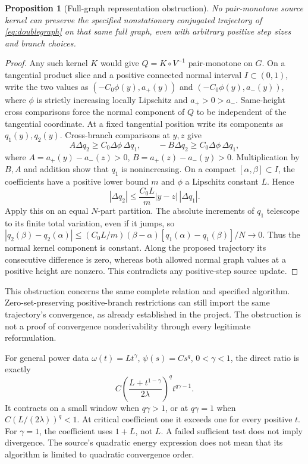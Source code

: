 \documentclass[11pt]{article}
\newtheorem{proposition}[theorem]{Proposition}
\theoremstyle{remark}
\begin{document}
\begin{proposition}[Full-graph representation obstruction]\label{prop:obstruction}
No pair-monotone source kernel can preserve the specified nonstationary
conjugated trajectory of \eqref{eq:doublegraph} on that same full graph,
even with arbitrary positive step sizes and branch choices.
\end{proposition}
\begin{proof}
Any such kernel $K$ would give $Q=K\circ V^{-1}$ pair-monotone on
$G$. On a tangential product slice and a positive connected normal
interval $I\subset(0,1)$, write the two values as
$(-C_0\phi(y),a_+(y))$ and $(-C_0\phi(y),a_-(y))$,
where $\phi$ is strictly increasing locally Lipschitz and
$a_+>0>a_-$. Same-height cross comparisons force the normal component
of $Q$ to be independent of the tangential coordinate. At a fixed
tangential position write its components as $q_1(y),q_2(y)$.
Cross-branch comparisons at $y,z$ give
\begin{equation}
 A\Delta q_2\ge C_0\Delta\phi\,\Delta q_1,\qquad
 -B\Delta q_2\ge C_0\Delta\phi\,\Delta q_1,
\end{equation}
where $A=a_+(y)-a_-(z)>0$, $B=a_+(z)-a_-(y)>0$.
Multiplication by $B,A$ and addition show that $q_1$ is nonincreasing.
On a compact $[\alpha,\beta]\subset I$, the coefficients have a
positive lower bound $m$ and $\phi$ a Lipschitz constant $L$. Hence
\begin{equation}
 |\Delta q_2|\le\frac{C_0L}{m}|y-z|\,|\Delta q_1|.
\end{equation}
Apply this on an equal $N$-part partition. The absolute increments
of $q_1$ telescope to its finite total variation, even if it jumps,
so $|q_2(\beta)-q_2(\alpha)|\le
(C_0L/m)(\beta-\alpha)[q_1(\alpha)-q_1(\beta)]/N\to0$.
Thus the normal kernel component is constant. Along the proposed
trajectory its consecutive difference is zero, whereas both allowed
normal graph values at a positive height are nonzero. This contradicts
any positive-step source update.
\end{proof}
This obstruction concerns the same complete relation and specified
algorithm. Zero-set-preserving positive-branch restrictions can still
import the same trajectory's convergence, as already established in
the project. The obstruction is not a proof of convergence
nonderivability through every legitimate reformulation.

For general power data $\omega(t)=Lt^\gamma$, $\psi(s)=Cs^q$,
$0<\gamma<1$, the direct ratio is exactly
\begin{equation}
 C\left(\frac{L+t^{1-\gamma}}{2\lambda}\right)^q t^{q\gamma-1}.
\end{equation}
It contracts on a small window when $q\gamma>1$, or at $q\gamma=1$
when $C(L/(2\lambda))^q<1$. At critical coefficient one it exceeds
one for every positive $t$. For $\gamma=1$, the coefficient uses
$1+L$, not $L$. A failed sufficient test does not imply divergence.
The source's quadratic energy expression does not mean that its
algorithm is limited to quadratic convergence order.
\end{document}
